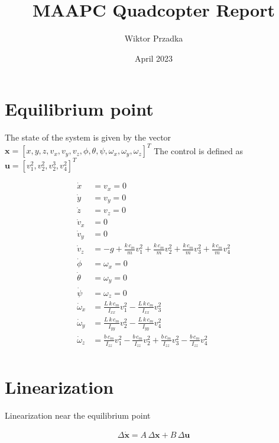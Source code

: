 \documentclass{article}
\title{MAAPC Quadcopter Report}
\author{Wiktor Przadka}
\date{April 2023}
\begin{document}
\maketitle



\section{Equilibrium point}

The state of the system is given by the vector \(\mathbf{x} = [x, y, z, v_x, v_y, v_z, \phi, \theta, \psi, \omega_x, \omega_y, \omega_z]^T\)
The control is defined as \(\mathbf{u} = [v_1^2, v_2^2, v_2^3, v^2_4]^T\)

\begin{align}
    \dot{x} &= v_x = 0\\
    \dot{y} &= v_y = 0\\
    \dot{z} &= v_z = 0\\
    \dot{v}_x &= 0\\
    \dot{v}_y &= 0\\
    \dot{v}_z &= -g + \frac{k\,c_m}{m} v_1^2 + \frac{k\,c_m}{m} v_2^2 + \frac{k\,c_m}{m} v_3^2 + \frac{k\,c_m}{m} v_4^2\\ 
    \dot{\phi} &= \omega_x = 0\\
    \dot{\theta} &= \omega_y = 0\\
    \dot{\psi} &= \omega_z = 0\\
    \dot{\omega}_x &= \frac{L\,k\,c_m}{I_{xx}} v_1^2 - \frac{L\,k\,c_m}{I_{xx}} v_3^2\\
    \dot{\omega}_y &= \frac{L\,k\,c_m}{I_{yy}} v_2^2 - \frac{L\,k\,c_m}{I_{yy}} v_4^2\\
    \dot{\omega}_z &= \frac{b\,c_m}{I_{zz}} v_1^2 - \frac{b\,c_m}{I_{zz}} v_2^2 + \frac{b\,c_m}{I_{zz}} v_3^2 - \frac{b\,c_m}{I_{zz}} v_4^2\\
\end{align}

\section{Linearization}

Linearization near the equilibrium point

\begin{align}
    \Delta \mathbf{\dot{x}} = A\,\Delta \mathbf{x} + B\,\Delta \mathbf{u}
\end{align}
\end{document}
